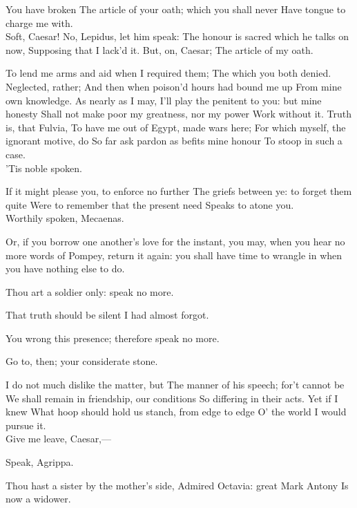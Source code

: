 \documentclass{book}
\begin{document}
\3	You have broken
	The article of your oath; which you shall never
	Have tongue to charge me with. \\

	Soft, Caesar! 
\1	No, Lepidus, let him speak:
	The honour is sacred which he talks on now,
	Supposing that I lack'd it. But, on, Caesar;
	The article of my oath.

\3	To lend me arms and aid when I required them;
	The which you both denied. \\

\1	Neglected, rather;
	And then when poison'd hours had bound me up
	From mine own knowledge. As nearly as I may,
	I'll play the penitent to you: but mine honesty
	Shall not make poor my greatness, nor my power
	Work without it. Truth is, that Fulvia,
	To have me out of Egypt, made wars here;
	For which myself, the ignorant motive, do
	So far ask pardon as befits mine honour
	To stoop in such a case. \\

	'Tis noble spoken.

	If it might please you, to enforce no further
	The griefs between ye: to forget them quite
	Were to remember that the present need
	Speaks to atone you.\\

	Worthily spoken, Mecaenas.

	Or, if you borrow one another's love for the
	instant, you may, when you hear no more words of
	Pompey, return it again: you shall have time to
	wrangle in when you have nothing else to do.

\1	Thou art a soldier only: speak no more.

	That truth should be silent I had almost forgot.

\1	You wrong this presence; therefore speak no more.

	Go to, then; your considerate stone.

\3	I do not much dislike the matter, but
	The manner of his speech; for't cannot be
	We shall remain in friendship, our conditions
	So differing in their acts. Yet if I knew  
	What hoop should hold us stanch, from edge to edge
	O' the world I would pursue it. \\

\4	Give me leave, Caesar,---  

\3	Speak, Agrippa.

\4	Thou hast a sister by the mother's side,
	Admired Octavia: great Mark Antony
	Is now a widower. \\
\end{document}
